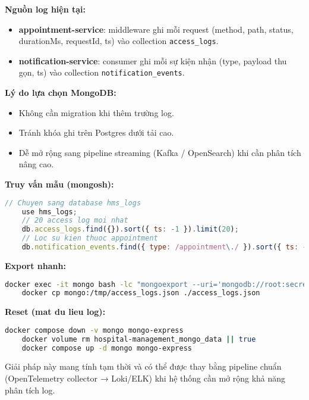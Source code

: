 \documentclass[12pt,a4paper]{report}
\begin{document}
            \textbf{Nguồn log hiện tại:}
    \begin{itemize}
        \item \textbf{appointment-service}: middleware ghi mỗi request (method, path, status, durationMs, requestId, ts) vào collection \texttt{access\_logs}.
        \item \textbf{notification-service}: consumer ghi mỗi sự kiện nhận (type, payload thu gọn, ts) vào collection \texttt{notification\_events}.
    \end{itemize}

            \textbf{Lý do lựa chọn MongoDB:}
    \begin{itemize}
        \item Không cần migration khi thêm trường log.
        \item Tránh khóa ghi trên Postgres dưới tải cao.
        \item Dễ mở rộng sang pipeline streaming (Kafka / OpenSearch) khi cần phân tích nâng cao.
    \end{itemize}

    \textbf{Truy vấn mẫu (mongosh):}
    \begin{lstlisting}[language=JavaScript]
    // Chuyen sang database hms_logs
    use hms_logs;
    // 20 access log moi nhat
    db.access_logs.find({}).sort({ ts: -1 }).limit(20);
    // Loc su kien thuoc appointment
    db.notification_events.find({ type: /appointment\./ }).sort({ ts: -1 }).limit(20);
    \end{lstlisting}

    \textbf{Export nhanh:}
    \begin{lstlisting}[language=bash]
    docker exec -it mongo bash -lc "mongoexport --uri='mongodb://root:secret@localhost:27017/hms_logs?authSource=admin' --collection=access_logs --out=/tmp/access_logs.json"
    docker cp mongo:/tmp/access_logs.json ./access_logs.json
    \end{lstlisting}

    \textbf{Reset (mat du lieu log):}
    \begin{lstlisting}[language=bash]
    docker compose down -v mongo mongo-express
    docker volume rm hospital-management_mongo_data || true
    docker compose up -d mongo mongo-express
    \end{lstlisting}

    Giải pháp này mang tính tạm thời và có thể được thay bằng pipeline chuẩn (OpenTelemetry collector → Loki/ELK) khi hệ thống cần mở rộng khả năng phân tích log.
\end{document}
